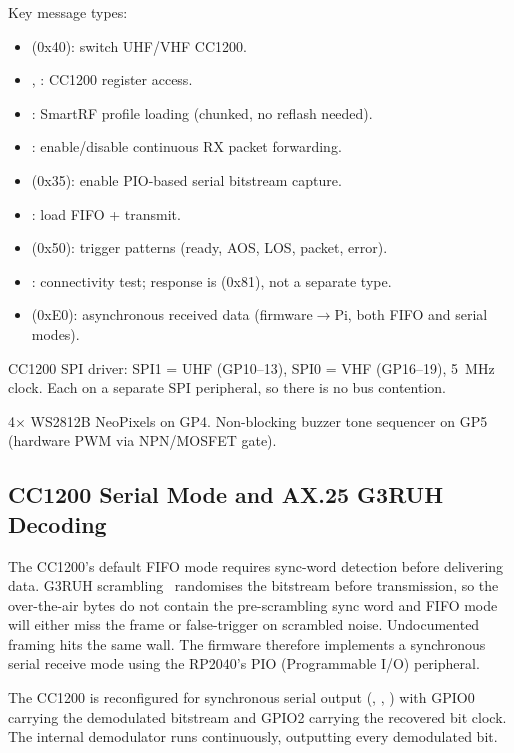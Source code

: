 Key message types:
\begin{itemize}
    \item {} (0x40): switch UHF/VHF CC1200.
    \item {}, : CC1200 register access.
    \item {}: SmartRF profile loading (chunked, no reflash needed).
    \item {}: enable/disable continuous RX packet forwarding.
    \item {} (0x35): enable PIO-based serial bitstream capture.
    \item {}: load FIFO + transmit.
    \item {} (0x50): trigger patterns (ready, AOS, LOS, packet, error).
    \item {}: connectivity test; response is  (0x81), not a separate type.
    \item {} (0xE0): asynchronous received data (firmware$\to$Pi, both FIFO and serial modes).
\end{itemize}

CC1200 SPI driver: SPI1 = UHF (GP10--13), SPI0 = VHF (GP16--19), 5~MHz clock. Each on a separate SPI peripheral, so there is no bus contention.

4$\times$ WS2812B NeoPixels on GP4. Non-blocking buzzer tone sequencer on GP5 (hardware PWM via NPN/MOSFET gate).

\subsection{CC1200 Serial Mode and AX.25 G3RUH Decoding}
\label{sec:serial-mode}

The CC1200's default FIFO mode requires sync-word detection before delivering data. G3RUH scrambling~\cite{g3ruh-scrambler} randomises the bitstream before transmission, so the over-the-air bytes do not contain the pre-scrambling sync word and FIFO mode will either miss the frame or false-trigger on scrambled noise. Undocumented framing hits the same wall. The firmware therefore implements a synchronous serial receive mode using the RP2040's PIO (Programmable I/O) peripheral.

The CC1200 is reconfigured for synchronous serial output (, , ) with GPIO0 carrying the demodulated bitstream and GPIO2 carrying the recovered bit clock. The internal demodulator runs continuously, outputting every demodulated bit.


